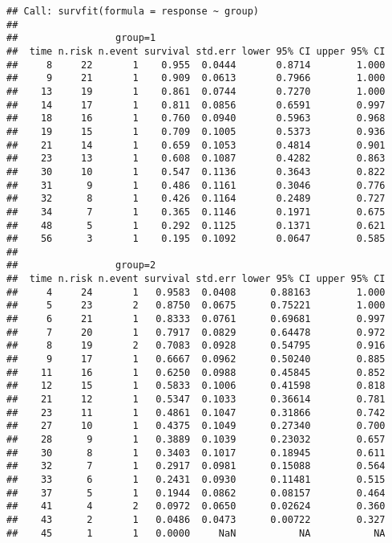 \documentclass[
  12pt,
  a4paper]{book}
\begin{document}
\begin{verbatim}
## Call: survfit(formula = response ~ group)
## 
##                 group=1 
##  time n.risk n.event survival std.err lower 95% CI upper 95% CI
##     8     22       1    0.955  0.0444       0.8714        1.000
##     9     21       1    0.909  0.0613       0.7966        1.000
##    13     19       1    0.861  0.0744       0.7270        1.000
##    14     17       1    0.811  0.0856       0.6591        0.997
##    18     16       1    0.760  0.0940       0.5963        0.968
##    19     15       1    0.709  0.1005       0.5373        0.936
##    21     14       1    0.659  0.1053       0.4814        0.901
##    23     13       1    0.608  0.1087       0.4282        0.863
##    30     10       1    0.547  0.1136       0.3643        0.822
##    31      9       1    0.486  0.1161       0.3046        0.776
##    32      8       1    0.426  0.1164       0.2489        0.727
##    34      7       1    0.365  0.1146       0.1971        0.675
##    48      5       1    0.292  0.1125       0.1371        0.621
##    56      3       1    0.195  0.1092       0.0647        0.585
## 
##                 group=2 
##  time n.risk n.event survival std.err lower 95% CI upper 95% CI
##     4     24       1   0.9583  0.0408      0.88163        1.000
##     5     23       2   0.8750  0.0675      0.75221        1.000
##     6     21       1   0.8333  0.0761      0.69681        0.997
##     7     20       1   0.7917  0.0829      0.64478        0.972
##     8     19       2   0.7083  0.0928      0.54795        0.916
##     9     17       1   0.6667  0.0962      0.50240        0.885
##    11     16       1   0.6250  0.0988      0.45845        0.852
##    12     15       1   0.5833  0.1006      0.41598        0.818
##    21     12       1   0.5347  0.1033      0.36614        0.781
##    23     11       1   0.4861  0.1047      0.31866        0.742
##    27     10       1   0.4375  0.1049      0.27340        0.700
##    28      9       1   0.3889  0.1039      0.23032        0.657
##    30      8       1   0.3403  0.1017      0.18945        0.611
##    32      7       1   0.2917  0.0981      0.15088        0.564
##    33      6       1   0.2431  0.0930      0.11481        0.515
##    37      5       1   0.1944  0.0862      0.08157        0.464
##    41      4       2   0.0972  0.0650      0.02624        0.360
##    43      2       1   0.0486  0.0473      0.00722        0.327
##    45      1       1   0.0000     NaN           NA           NA
\end{verbatim}
\end{document}
